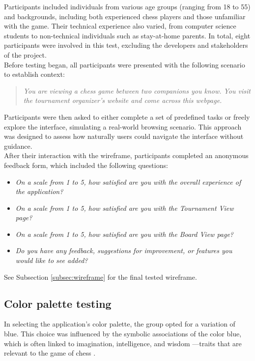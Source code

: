 Participants included individuals from various age groups (ranging from 18 to 55) and backgrounds, including both experienced chess players and those unfamiliar with the game. Their technical experience also varied, from computer science students to non-technical individuals such as stay-at-home parents. In total, eight participants were involved in this test, excluding the developers and stakeholders of the project. \\

Before testing began, all participants were presented with the following scenario to establish context:

\begin{quote}
\textit{You are viewing a chess game between two companions you know. You visit the tournament organizer's website and come across this webpage.}
\end{quote}

Participants were then asked to either complete a set of predefined tasks or freely explore the interface, simulating a real-world browsing scenario. This approach was designed to assess how naturally users could navigate the interface without guidance. \\

After their interaction with the wireframe, participants completed an anonymous feedback form, which included the following questions:

\begin{itemize}
    \item \textit{On a scale from 1 to 5, how satisfied are you with the overall experience of the application?}
    \item \textit{On a scale from 1 to 5, how satisfied are you with the Tournament View page?}
    \item \textit{On a scale from 1 to 5, how satisfied are you with the Board View page?}
    \item \textit{Do you have any feedback, suggestions for improvement, or features you would like to see added?}
\end{itemize}

See Subsection \ref{subsec:wireframe} for the final tested wireframe.


\subsection{Color palette testing}
\label{subsubsec:color-palette}

In selecting the application’s color palette, the group opted for a variation of blue. This choice was influenced by the symbolic associations of the color blue, which is often linked to imagination, intelligence, and wisdom \cite{blue}—traits that are relevant to the game of chess \cite{chess:ppqty, chess:chess-and-creativity}. \\

